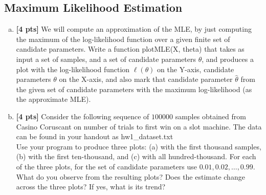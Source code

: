 \documentclass{article}
\newenvironment{soln}{
	\leavevmode\color{blue}\ignorespaces
}{}
\begin{document}
\subsection{Maximum Likelihood Estimation}
\begin{enumerate}[(a)]

    \item \textbf{[4 pts]} We will compute an approximation of the MLE, by just computing the maximum of the log-likelihood function over a given finite set of candidate parameters. Write a function plotMLE(X, theta) that takes as input a set of samples, and a set of candidate parameters $\theta$, and produces a plot with the log-likelihood function $\ell(\theta)$ on the Y-axis, candidate parameters $\theta$ on the X-axis, and also mark that candidate parameter $\hat{\theta}$ from the given set of candidate parameters with the maximum log-likelihood (as the approximate MLE). \\
    
    \begin{soln}
    
    \end{soln}
	
    \item \textbf{[4 pts]} Consider the following sequence of $100000$ samples obtained from Casino Coruscant on number of trials to first win on a slot machine. The data can be found in your handout as hw1\_dataset.txt\\
    Use your program to produce three plots: (a) with the first thousand samples, (b) with the first ten-thousand, and (c) with all hundred-thousand. For each of the three plots, for the set of candidate parameters use ${0.01, 0.02,\ldots,0.99}$. What do you observe from the resulting plots? Does the estimate change across the three plots? If yes, what is its trend?  \\
    
    \begin{soln}
   
    \end{soln}
	
\end{enumerate}
\end{document}
